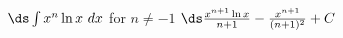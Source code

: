 {$\ds \int x^n \ln x\ dx$ for $n\not=-1$}
{$\ds \frac{x^{n+1}\ln x}{n+1} - \frac{x^{n+1}}{(n+1)^2}+C$
}

